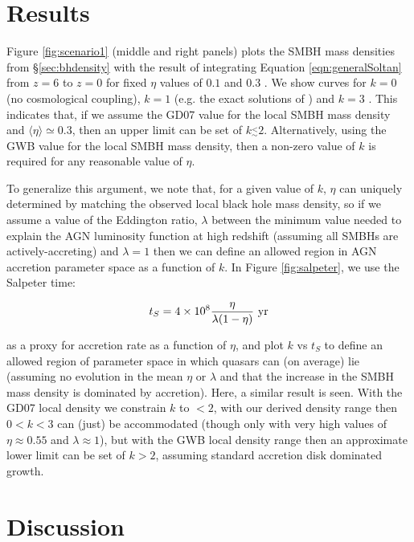 \documentclass[twocolumn]{aastex631}
\begin{document}
\section{Results}\label{sec:res}
Figure \ref{fig:scenario1} (middle and right panels) plots the SMBH mass densities from \S\ref{sec:bhdensity} with the result of integrating Equation \ref{eqn:generalSoltan} from $z=6$ to $z=0$ for fixed $\eta$ values of $0.1$ and $0.3$ \citep{1974ApJ...191..507T}. We show curves for $k=0$ (no cosmological coupling), $k=1$ (e.g. the exact solutions of \citealt{farja07}) and $k=3$ \citep{2023ApJ...944L..31F}. This indicates that, if we assume the GD07 value for the local SMBH mass density and $\langle\eta\rangle\simeq0.3$, then an upper limit can be set of $k\stackrel{<}{_{\sim}}2$. Alternatively, using the GWB value for the local SMBH mass density, then a non-zero value of $k$ is required for any reasonable value of $\eta$.

To generalize this argument, we note that, for a given value of $k$, $\eta$ can uniquely determined by matching the observed local black hole mass density, so if we assume a value of the Eddington ratio, $\lambda$ between the minimum value needed to explain the AGN luminosity function at high redshift (assuming all SMBHs are actively-accreting) and $\lambda=1$ then we can define an allowed region in AGN accretion parameter space as a function of $k$. In Figure \ref{fig:salpeter}, we use the Salpeter time:

\begin{equation}\label{salptime}
t_S=4\times 10^8 \frac{\eta}{\lambda(1-\eta)}~{\rm yr}
\end{equation}

\noindent as a proxy for accretion rate as a function of $\eta$, and plot $k$ vs $t_S$ to define an allowed region of parameter space in which quasars can (on average) lie (assuming no evolution in the mean $\eta$ or $\lambda$ and that the increase in the SMBH mass density is dominated by accretion). Here, a similar result is seen. With the GD07 local density we constrain $k$ to $<2$, with our derived density range then $0<k<3$ can (just) be accommodated (though only with very high values of $\eta \approx 0.55$ and $\lambda\approx 1$), but with the GWB local density range then an approximate lower limit can be set of $k>2$, assuming standard accretion disk dominated growth.


\section{Discussion}\label{sec:disc}
\end{document}
